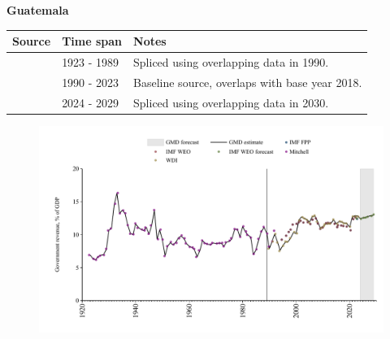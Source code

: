 \documentclass[12pt,a4paper,landscape]{article}
\begin{document}
\begin{adjustbox}{max totalsize={\paperwidth}{\paperheight},center}
\begin{minipage}[t][\textheight][t]{\textwidth}
\vspace*{0.5cm}
{}
\begin{center}
{\Large\bfseries Guatemala}
\end{center}
\vspace{0.5cm}
\begin{table}[H]
\centering
\small
\begin{tabular}{|l|l|l|}
\hline
\textbf{Source} & \textbf{Time span} & \textbf{Notes} \\
\hline
\rowcolor{white}\cite{Mitchell}& 1923 - 1989 &Spliced using overlapping data in 1990.\\
\rowcolor{lightgray}\cite{WDI}& 1990 - 2023 &Baseline source, overlaps with base year 2018.\\
\rowcolor{white}\cite{IMF_WEO_forecast}& 2024 - 2029 &Spliced using overlapping data in 2030.\\
\hline
\end{tabular}
\end{table}
\begin{figure}[H]
\centering
\includegraphics[width=\textwidth,height=0.6\textheight,keepaspectratio]{graphs/GTM_govrev_GDP.pdf}
\end{figure}
\end{minipage}
\end{adjustbox}
\end{document}
